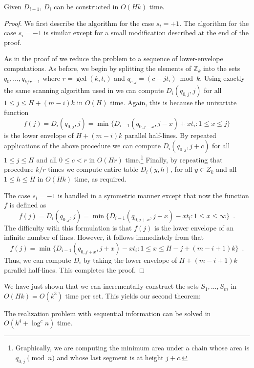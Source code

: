 \documentclass{elsart}
\newcommand{\Z}{\mathbb{Z}}
\begin{document}
\begin{lem}
Given $D_{i-1}$, $D_i$ can be constructed in $O(Hk)$ time.
\end{lem}

\begin{proof}
We first describe the algorithm for the case $s_i=+1$. The algorithm
for the case $s_i=-1$ is similar except for a small modification
described at the end of the proof.

As in the proof of  we reduce the problem to a 
sequence of lower-envelope
computations.   As before, we begin by
splitting the elements of $\Z_k$ into the sets
$q_{0},\ldots,q_{k/r-1}$ where $r=\gcd(k,t_i)$ and
$q_{c,j}=(c+jt_i)\bmod k$.
Using exactly the same scanning algorithm used in  we
can compute $D_i(q_{0,j},j)$ for all $1\le j\le H+(m-i)k$ in $O(H)$ time.
Again, this is because the univariate function
\[ f(j) = D_i(q_{0,j},j) = \min\{ D_{i-1}(q_{0,j-x},j-x) + xt_i : 1\le
x\le j\} 
\]
is the lower envelope of $H+(m-i)k$ parallel half-lines.  By repeated
applications of the above procedure we can compute $D_i(q_{0,j},j+c)$
for all $1\le j\le H$ and all $0\le c< r$ in $O(Hr)$
time.\footnote{Graphically, we are computing the minimum area under a
chain whose area is $q_{0,j} \pmod{n}$ and whose last segment is at
height $j+c$.}
Finally, by repeating that
procedure $k/r$ times we compute entire table $D_i(y,h)$, for all
$y\in Z_k$ and all $1\le h\le H$ in $O(Hk)$ time, as required. 

The case $s_{i}=-1$ is handled in a symmetric manner except that now
the function $f$ is defined as
\[
  f(j) = D_{i}(q_{0,j},j) = \min\{D_{i-1}(q_{0,j+x},j+x) - xt_i :
1\le x\le \infty\} \enspace .
\]
The difficulty with this formulation is that $f(j)$ is the lower
envelope of an infinite number of lines.  However, it follows immediately from  that 
\[
  f(j) = \min\{D_{i-1}(q_{0,j+x},j+x) - xt_i : 1\le x\le H-j+(m-i+1)k\} \enspace .
\]
Thus, we can compute $D_i$ by taking the lower envelope of
$H+(m-i+1)k$ parallel half-lines.  This completes the proof.
\end{proof}

We have just shown that we can incrementally construct the sets
$S_1,\ldots,S_m$ in $O(Hk)=O(k^3)$ time per set.  This yields our
second theorem:

\begin{thm}
The realization problem with sequential information can be solved in
$O(k^4+\log^c n)$ time.
\end{thm}
\end{document}
